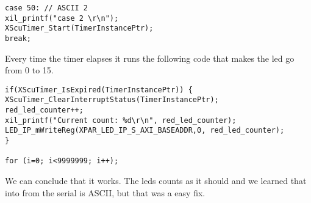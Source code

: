 \begin{lstlisting}[style=customc++, caption= case 2: Counts binary the red led’s using a timer of 1 sec ,
label={lst:masterslaveadaptersource}]
		case 50: // ASCII 2
xil_printf("case 2 \r\n");
XScuTimer_Start(TimerInstancePtr);
break;
\end{lstlisting}

Every time the timer elapses it runs the following code that makes the led go from 0 to 15.
\begin{lstlisting}[style=customc++, caption= case 2: Counts binary the red led’s using a timer of 1 sec ,
label={lst:masterslaveadaptersource}]
	   if(XScuTimer_IsExpired(TimerInstancePtr)) {
XScuTimer_ClearInterruptStatus(TimerInstancePtr);
red_led_counter++;
xil_printf("Current count: %d\r\n", red_led_counter);
LED_IP_mWriteReg(XPAR_LED_IP_S_AXI_BASEADDR,0, red_led_counter);
}

for (i=0; i<9999999; i++);
\end{lstlisting}

We can conclude that it works. The leds counts as it should and we learned that into from the serial is ASCII, but that was a easy fix.









